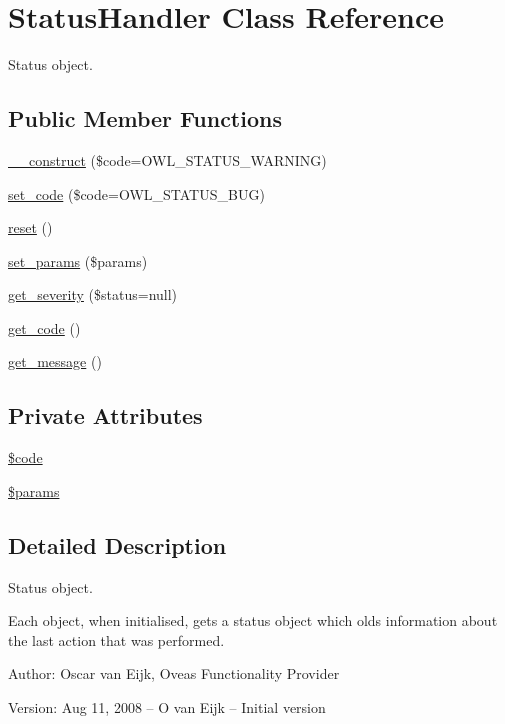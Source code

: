 \hypertarget{classStatusHandler}{
\section{StatusHandler Class Reference}
\label{classStatusHandler}
}
Status object.  


\subsection*{Public Member Functions}
\begin{CompactItemize}
\item 
\hyperlink{classStatusHandler_5cb2ad461aa4afc7ec9115c176eb354e}{\_\-\_\-construct} (\$code=OWL\_\-STATUS\_\-WARNING)
\item 
\hyperlink{classStatusHandler_748d462386322a552aa798f951258c91}{set\_\-code} (\$code=OWL\_\-STATUS\_\-BUG)
\item 
\hyperlink{classStatusHandler_8b0a327d3272ae49032a596518d47164}{reset} ()
\item 
\hyperlink{classStatusHandler_c35544d3ad8a435f69db0965ed674428}{set\_\-params} (\$params)
\item 
\hyperlink{classStatusHandler_cadd0806c17eb02abcc92882e8588d4e}{get\_\-severity} (\$status=null)
\item 
\hyperlink{classStatusHandler_d39bc4e6a56b6d418a252957da9b4417}{get\_\-code} ()
\item 
\hyperlink{classStatusHandler_79170bca79bfd82e3f707e1294e7c916}{get\_\-message} ()
\end{CompactItemize}
\subsection*{Private Attributes}
\begin{CompactItemize}
\item 
\hyperlink{classStatusHandler_b74e826d2401345eb20b11fe7d78aa45}{\$code}
\item 
\hyperlink{classStatusHandler_599f9c9284340399fdcb7dac9cb7856f}{\$params}
\end{CompactItemize}


\subsection{Detailed Description}
Status object. 

Each object, when initialised, gets a status object which olds information about the last action that was performed. \begin{Desc}
\item[Author:]Oscar van Eijk, Oveas Functionality Provider \end{Desc}
\begin{Desc}
\item[Version:]Aug 11, 2008 -- O van Eijk -- Initial version \end{Desc}


